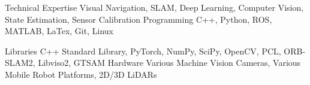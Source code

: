 

\begin{cvskills}

  \cvskill
    {Technical Expertise} %
    {Visual Navigation, SLAM, Deep Learning, Computer Vision, State Estimation, Sensor Calibration} %
  \cvskill
    {Programming} %
    {C++, Python, ROS, MATLAB, LaTex, Git, Linux} %
    
\cvskill
    {Libraries} %
    {C++ Standard Library, PyTorch, NumPy, SciPy, OpenCV, PCL, ORB-SLAM2, Libviso2, GTSAM} %
  \cvskill
    {Hardware} %
    {Various Machine Vision Cameras, Various Mobile Robot Platforms, 2D/3D LiDARs} %

\end{cvskills}
